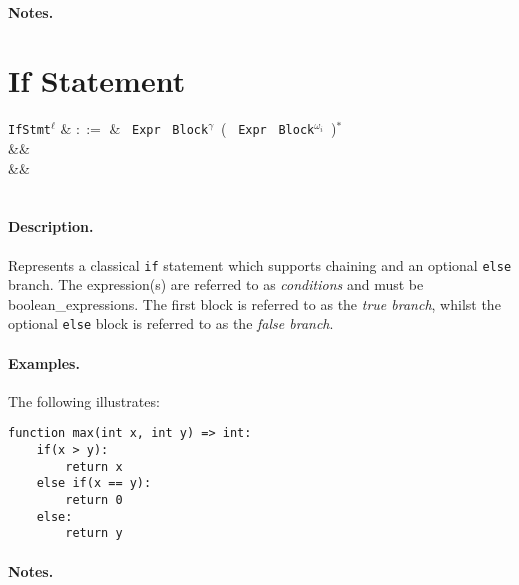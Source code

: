 \paragraph{Notes.} 



\section{If Statement}

\begin{syntax}
  \verb+IfStmt+$^\ell$ & $::=$ & \ \verb+Expr+\ \token{:}
  \verb+Block+$^\gamma$\ \big(  \ \verb+Expr+\ \token{:}
  \verb+Block+$^{\omega_i}$\ \big)$^*$ \\
&& \\
&&\\
\\
\end{syntax}

\paragraph{Description.} Represents a classical \lstinline{if}
statement which supports chaining and an optional \lstinline{else}
branch.  The expression(s) are referred to as {\em conditions} and must
be \gls{boolean_expression}s.  The first block is referred to as the
{\em true branch}, whilst the optional \lstinline{else} block is
referred to as the {\em false branch}.

\paragraph{Examples.} The following illustrates:

\begin{lstlisting}
function max(int x, int y) => int:
    if(x > y):
        return x
    else if(x == y):
        return 0
    else:
        return y
\end{lstlisting}

\paragraph{Notes.} 

